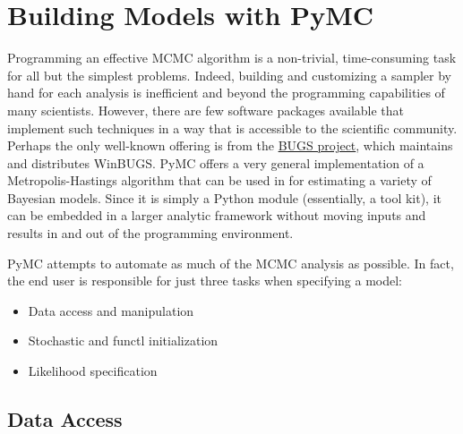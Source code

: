 \documentclass[]{book}
\begin{document}
\chapter{Building Models with PyMC}

Programming an effective MCMC algorithm is a non-trivial, time-consuming task for all but the simplest problems. Indeed, building and customizing a sampler by hand for each analysis is inefficient and beyond the programming capabilities of many scientists. However, there are few software packages available that implement such techniques in a way that is accessible to the scientific community. Perhaps the only well-known offering is from the \href{http://www.mrc-bsu.cam.ac.uk/bugs/}{BUGS project}, which maintains and distributes WinBUGS. PyMC offers a very general implementation of a Metropolis-Hastings algorithm that can be used in for estimating a variety of Bayesian models. Since it is simply a Python module (essentially, a tool kit), it can be embedded in a larger analytic framework without moving inputs and results in and out of the programming environment.

PyMC attempts to automate as much of the MCMC analysis as possible. In fact, the end user is responsible for just three tasks when specifying a model:
\begin{itemize}

    \item Data access and manipulation

    \item Stochastic and functl initialization

    \item Likelihood specification

\end{itemize}

\section{Data Access}\label{sec:data_access}
\end{document}
